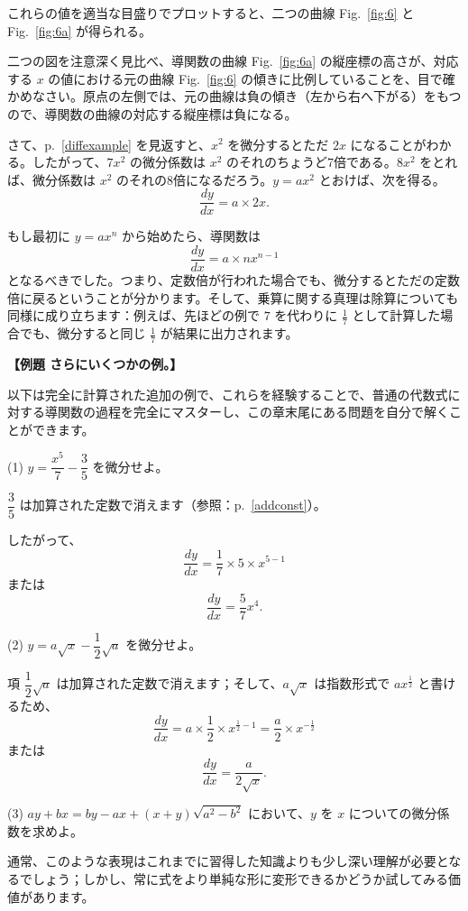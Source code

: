 \documentclass[a4paper,11pt,openany]{ltjsbook}
\newcommand{\Pageref}[2][p.]{#1~\ref{#2}}
\newcommand{\Fig}[1]{Fig.~\ref{fig:#1}}
\begin{document}
これらの値を適当な目盛りでプロットすると、二つの曲線 \Fig{6} と \Fig{6a} が得られる。

二つの図を注意深く見比べ、導関数の曲線 \Fig{6a} の縦座標の高さが、対応する \( x \) の値における元の曲線 \Fig{6} の傾きに比例していることを、目で確かめなさい。原点の左側では、元の曲線は負の傾き（左から右へ下がる）をもつので、導関数の曲線の対応する縦座標は負になる。

さて、\Pageref{diffexample} を見返すと、\( x^2 \) を微分するとただ \( 2x \) になることがわかる。したがって、\( 7x^2 \) の微分係数は \( x^2 \) のそれのちょうど7倍である。\( 8x^2 \) をとれば、微分係数は \( x^2 \) のそれの8倍になるだろう。\( y = ax^2 \) とおけば、次を得る。
\[
\frac{dy}{dx} = a \times  2x.
\]

もし最初に \( y = ax^n \) から始めたら、導関数は
\[
\dfrac{dy}{dx} = a\times nx^{n-1}
\]
となるべきでした。つまり、定数倍が行われた場合でも、微分するとただの定数倍に戻るということが分かります。そして、乗算に関する真理は除算についても同様に成り立ちます：例えば、先ほどの例で \( 7 \) を代わりに \(\frac{1}{7}\) として計算した場合でも、微分すると同じ \(\frac{1}{7}\) が結果に出力されます。

\par\textbf{【例題 さらにいくつかの例。】}\par
以下は完全に計算された追加の例で、これらを経験することで、普通の代数式に対する導関数の過程を完全にマスターし、この章末尾にある問題を自分で解くことができます。

(1) \( y = \dfrac{x^5}{7} - \dfrac{3}{5} \) を微分せよ。

\(\dfrac{3}{5}\) は加算された定数で消えます（参照：\Pageref{addconst}）。

したがって、
\[
\dfrac{dy}{dx} = \dfrac{1}{7} \times  5 \times  x^{5-1}
\]
または
\[
\dfrac{dy}{dx} = \dfrac{5}{7} x^4.
\]

(2) \( y = a\sqrt{x} - \dfrac{1}{2}\sqrt{a} \) を微分せよ。

項 \(\dfrac{1}{2}\sqrt{a}\) は加算された定数で消えます；そして、\( a\sqrt{x} \) は指数形式で \( ax^{\frac{1}{2}} \) と書けるため、
\[
\dfrac{dy}{dx}
  = a \times  \dfrac{1}{2} \times  x^{\frac{1}{2}-1}
  = \dfrac{a}{2} \times  x^{-\frac{1}{2}}
\]
または
\[
\dfrac{dy}{dx} = \dfrac{a}{2\sqrt{x}}.
\]

(3) \( ay + bx = by - ax + (x+y)\sqrt{a^2 - b^2} \) において、\( y \) を \( x \) についての微分係数を求めよ。

通常、このような表現はこれまでに習得した知識よりも少し深い理解が必要となるでしょう；しかし、常に式をより単純な形に変形できるかどうか試してみる価値があります。
\end{document}
